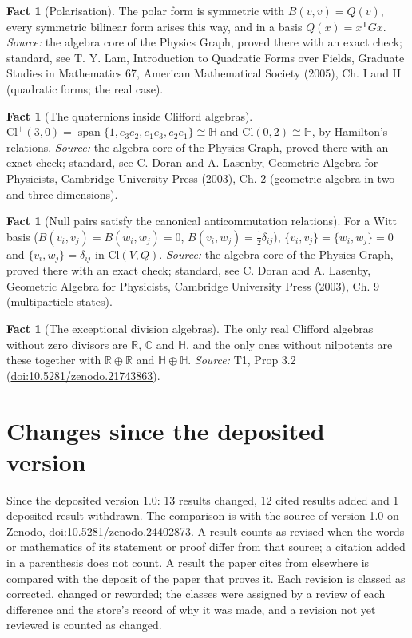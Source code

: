 \documentclass[11pt]{article}
\theoremstyle{definition}
\newtheorem{fact}[theorem]{Fact}
\theoremstyle{plain}
\providecommand{\C}{}\renewcommand{\C}{\mathbb{C}}
\providecommand{\Cl}{}\renewcommand{\Cl}{\mathrm{Cl}}
\providecommand{\HH}{}\renewcommand{\HH}{\mathbb{H}}
\providecommand{\R}{}\renewcommand{\R}{\mathbb{R}}
\begin{document}
\begin{fact}[Polarisation]\label{c:std-algebra.polarisation}
The polar form is symmetric with $B(v,v) = Q(v)$, every symmetric bilinear form arises this way, and in a basis $Q(x) = x^{\mathsf T} G x$.
\emph{Source:} the algebra core of the Physics Graph, proved there with an exact check; standard, see T. Y. Lam, Introduction to Quadratic Forms over Fields, Graduate Studies in Mathematics 67, American Mathematical Society (2005), Ch. I and II (quadratic forms; the real case).
\end{fact}

\begin{fact}[The quaternions inside Clifford algebras]\label{c:std-algebra.quaternions}
$\Cl^{+}(3,0) = \operatorname{span}\{1, e_3e_2, e_1e_3, e_2e_1\} \cong \HH$ and $\Cl(0,2) \cong \HH$, by Hamilton's relations.
\emph{Source:} the algebra core of the Physics Graph, proved there with an exact check; standard, see C. Doran and A. Lasenby, Geometric Algebra for Physicists, Cambridge University Press (2003), Ch. 2 (geometric algebra in two and three dimensions).
\end{fact}

\begin{fact}[Null pairs satisfy the canonical anticommutation relations]\label{c:std-algebra.witt-basis-car}
For a Witt basis ($B(v_i,v_j) = B(w_i,w_j) = 0$, $B(v_i,w_j) = \tfrac12\delta_{ij}$), $\{v_i,v_j\} = \{w_i,w_j\} = 0$ and $\{v_i,w_j\} = \delta_{ij}$ in $\Cl(V,Q)$.
\emph{Source:} the algebra core of the Physics Graph, proved there with an exact check; standard, see C. Doran and A. Lasenby, Geometric Algebra for Physicists, Cambridge University Press (2003), Ch. 9 (multiparticle states).
\end{fact}

\begin{fact}[The exceptional division algebras]\label{c:transport.exceptional-division-algebras}
The only real Clifford algebras without zero divisors are $\R$, $\C$ and $\HH$, and the only ones without nilpotents are these together with $\R \oplus \R$ and $\HH \oplus \HH$.
\emph{Source:} T1, Prop 3.2 (\href{https://doi.org/10.5281/zenodo.21743863}{doi:10.5281/zenodo.21743863}).
\end{fact}

\section*{Changes since the deposited version}
Since the deposited version 1.0: 13 results changed, 12 cited results added and 1 deposited result withdrawn. The comparison is with the source of version 1.0 on Zenodo, \href{https://doi.org/10.5281/zenodo.24402873}{doi:10.5281/zenodo.24402873}. A result counts as revised when the words or mathematics of its statement or proof differ from that source; a citation added in a parenthesis does not count. A result the paper cites from elsewhere is compared with the deposit of the paper that proves it. Each revision is classed as corrected, changed or reworded; the classes were assigned by a review of each difference and the store's record of why it was made, and a revision not yet reviewed is counted as changed.
\end{document}
